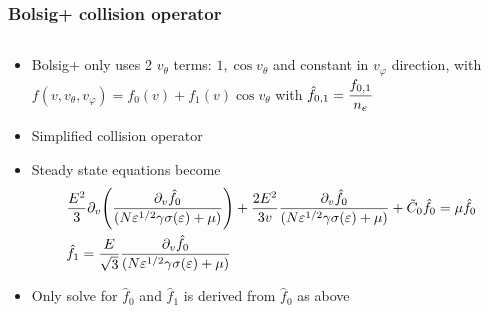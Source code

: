\documentclass[mathserif, aspectratio=169]{beamer}
\newcommand{\vect}[1]{\boldsymbol{#1}}
\newcommand{\of}[1]{\mleft( #1 \mright)}
\newcommand{\myint}{\int\limits}
\newcommand{\diff}[1]{\, d#1}
\newcommand{\vtheta}{{v_{\theta}}}
\newcommand{\vphi}{v_{\varphi}}
\begin{document}
\begin{frame}
	\frametitle{Bolsig+ collision operator}
	\begin{columns}
		\begin{column}{\textwidth}
			\begin{itemize}
				\item Bolsig+ only uses 2 $\vtheta$ terms: $1, \cos\vtheta$ and constant in $\vphi$ direction, with $f(v,\vtheta,\vphi) = f_0(v) + f_1(v) \cos\vtheta$ with $\hat{f}_{0,1} = \cfrac{f_{0,1}}{n_e}$
				\item Simplified collision operator
				\item Steady state equations become%
				\begin{align}
					&\frac{E^2}{3} \partial_{v} \of{\frac{\partial_v \hat f_0}{(N \varepsilon^{1/2}\gamma \sigma\of{\varepsilon} + \mu)}} + \frac{2E^2}{3v} \frac{\partial_v \hat{f_0}}{(N \varepsilon^{1/2}\gamma \sigma\of{\varepsilon} + \mu)} + \tilde C_0 \hat{f_0} = \mu \hat{f_0} \\
					&\hat{f_1} = \frac{E}{\sqrt{3}} \frac{\partial_{v}\hat{f_0}}{(N \varepsilon^{1/2}\gamma \sigma\of{\varepsilon} + \mu)}
				\end{align}
				\item Only solve for $\hat{f}_0$ and $\hat{f}_1$ is derived from $\hat{f}_0$ as above
			\end{itemize}
		\end{column}
			
	\end{columns}
\end{frame}
\end{document}
